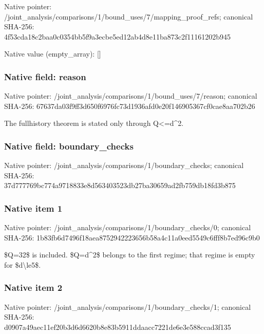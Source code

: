 \documentclass[10pt,a4paper]{article}
\begin{document}
Native pointer: /joint\_analysis/comparis\allowbreak{}ons/1/bound\_uses/7/mappi\allowbreak{}ng\_proof\_refs; canonical SHA-256: 4f53cda18c2baa0c0354bb5f\allowbreak{}9a3ecbe5ed12ab4d8e11ba87\allowbreak{}3c2f11161202b945



Native value (empty\_array): []



\subsubsection{Native field: reason}


Native pointer: /joint\_analysis/comparis\allowbreak{}ons/1/bound\_uses/7/reaso\allowbreak{}n; canonical SHA-256: 67637da03f9ff3d650f6976f\allowbreak{}c73d1936afd0e20f14690536\allowbreak{}7cf0cae8aa702b26


The fullhistory theorem is stated only through Q<=d\textasciicircum{}2.


\subsubsection{Native field: boundary\_checks}


Native pointer: /joint\_analysis/comparis\allowbreak{}ons/1/boundary\_checks; canonical SHA-256: 37d777769bc774a9718833e8\allowbreak{}d563403523db27ba30659ad2\allowbreak{}fb759db18fd3b875



\subsubsection{Native item 1}


Native pointer: /joint\_analysis/comparis\allowbreak{}ons/1/boundary\_checks/0; canonical SHA-256: 1b83fb6d7496f18aea875294\allowbreak{}2223656b58a4c11a0eed5549\allowbreak{}c6fff8b7ed96c9b0


\$Q=32\$ is included. \$Q=d\textasciicircum{}2\$ belongs to the first regime; that regime is empty for \$d\textbackslash{}le5\$.


\subsubsection{Native item 2}


Native pointer: /joint\_analysis/comparis\allowbreak{}ons/1/boundary\_checks/1; canonical SHA-256: d0907a49aec11ef20b3d6d66\allowbreak{}20b8e83b5911ddaacc7221de\allowbreak{}6e3e588ccad3f135
\end{document}
